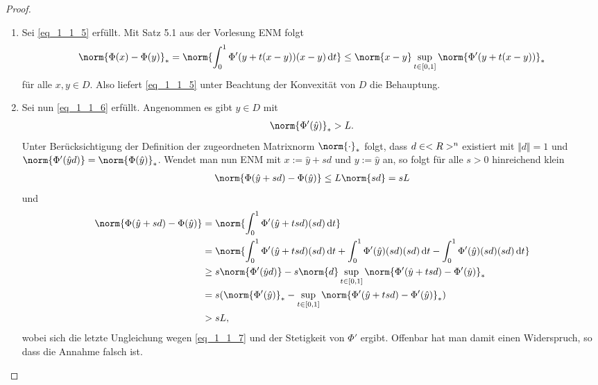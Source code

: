 \begin{proof}
	\begin{enumerate}
		\item Sei \cref{eq_1_1_5} erfüllt. Mit Satz 5.1 aus der Vorlesung ENM folgt %
		\begin{align}
		\norm{\Phi(x) - \Phi(y)}_{\ast} = \norm{\int_{0}^{1} \Phi'(y + t(x-y))(x-y) \diff t} \le  \norm{x-y} \sup_{t \in [0,1]} \norm{\Phi'(y+t(x-y))}_{\ast}
		\end{align}
		für alle $x,y \in D$. Also liefert \cref{eq_1_1_5} unter Beachtung der Konvexität von $D$ die Behauptung.
		\item Sei nun \cref{eq_1_1_6} erfüllt. Angenommen es gibt $\hat{y} \in D$ mit
		\begin{align}
		\norm{\Phi'(\hat{y})}_{\ast} > L. \label{eq_1_1_7}
		\end{align}
		Unter Berücksichtigung der Definition der zugeordneten Matrixnorm $\norm{\cdot}_{\ast}$ folgt, dass $d \in <R>^n$ existiert mit $\Vert d \Vert = 1$ und $\norm{\Phi'(\hat{y}d)} = \norm{\Phi(\hat{y})}_{\ast}$. Wendet man nun ENM mit $x := \hat{y} + sd$ und $y := \hat{y}$ an, so folgt für alle $s > 0$ hinreichend klein
		\begin{align}
		\norm{\Phi(\hat{y} + sd) - \Phi(\hat{y})} \le L \norm{sd} = sL
		\end{align}
		und 
		\begin{align}
		\norm{\Phi(\hat{y} + sd) - \Phi(\hat{y})} &= \norm{\int_{0}^{1} \Phi'(\hat{y} + tsd)(sd)\diff t}\notag \\
		&= \norm{\int_{0}^{1} \Phi'(\hat{y} + tsd)(sd)\diff t + \int_{0}^{1} \Phi'(\hat{y})(sd)(sd)\diff t - \int_{0}^{1} \Phi'(\hat{y})(sd)(sd)\diff t}\notag \\
		&\ge s\norm{\Phi'(\hat{y}d)} - s\norm{d} \sup_{t \in [0,1]}\norm{\Phi'(\hat{y} + tsd) - \Phi'(\hat{y})}_{\ast} \notag \\
		&= s (\norm{\Phi'(\hat{y})}_{\ast} - \sup_{t \in [0,1]}\norm{\Phi'(\hat{y} + tsd) - \Phi'(\hat{y})}_{\ast}) \notag\\
		&> sL, \notag
		\end{align}
		wobei sich die letzte Ungleichung wegen \cref{eq_1_1_7} und der Stetigkeit von $\Phi'$ ergibt. Offenbar hat man damit einen Widerspruch, so dass die Annahme falsch ist.
	\end{enumerate}
\end{proof}

